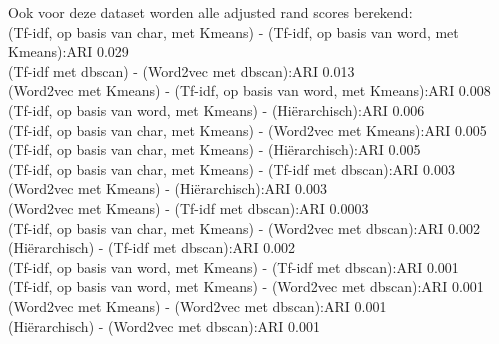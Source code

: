 Ook voor deze dataset worden alle adjusted rand scores berekend:
\\\indent(Tf-idf, op basis van char, met Kmeans) - (Tf-idf, op basis van word, met Kmeans):\hfill ARI 0.029
\\\indent(Tf-idf met dbscan) - (Word2vec met dbscan):\hfill ARI 0.013
\\\indent(Word2vec met Kmeans) - (Tf-idf, op basis van word, met Kmeans):\hfill ARI 0.008
\\\indent(Tf-idf, op basis van word, met Kmeans) - (Hiërarchisch):\hfill ARI 0.006
\\\indent(Tf-idf, op basis van char, met Kmeans) - (Word2vec met Kmeans):\hfill ARI 0.005
\\\indent(Tf-idf, op basis van char, met Kmeans) - (Hiërarchisch):\hfill ARI 0.005
\\\indent(Tf-idf, op basis van char, met Kmeans) - (Tf-idf met dbscan):\hfill ARI 0.003
\\\indent(Word2vec met Kmeans) - (Hiërarchisch):\hfill ARI 0.003
\\\indent(Word2vec met Kmeans) - (Tf-idf met dbscan):\hfill ARI 0.0003
\\\indent(Tf-idf, op basis van char, met Kmeans) - (Word2vec met dbscan):\hfill ARI 0.002
\\\indent(Hiërarchisch) - (Tf-idf met dbscan):\hfill ARI 0.002
\\\indent(Tf-idf, op basis van word, met Kmeans) - (Tf-idf met dbscan):\hfill ARI 0.001
\\\indent(Tf-idf, op basis van word, met Kmeans) - (Word2vec met dbscan):\hfill ARI 0.001
\\\indent(Word2vec met Kmeans) - (Word2vec met dbscan):\hfill ARI 0.001
\\\indent(Hiërarchisch) - (Word2vec met dbscan):\hfill ARI 0.001
\\\indent

